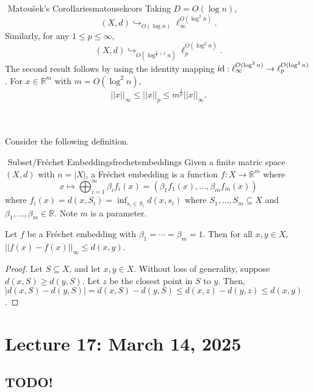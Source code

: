         \pagebreak
        \begin{corollary}{\Stop\,\,Matou\v{s}ek's Corollaries}{matousekcors}
            Taking \(D=O(\log n)\), 
            \begin{equation*}
                (X,d)\hookrightarrow_{O(\log n)}\ell_\infty^{O(\log^2n)}.
            \end{equation*}
            Similarly, for any \(1\leq p\leq\infty\),
            \begin{equation*}
                (X,d)\hookrightarrow_{O\left(\log^{\frac{2}{p}+1}n\right)}\ell_p^{O(\log^2n)}.
            \end{equation*}
            The second result follows by using the identity mapping \(\operatorname{id}:\ell_\infty^{O(\log^2n)}\to\ell_p^{O(\log^2n)}\). For \(x\in\mathbb{R}^m\) with \(m=O(\log^2n)\),
            \begin{equation*}
                ||x||_\infty\leq||x||_p\leq m^\frac{1}{p}||x||_\infty.
            \end{equation*} 
        \end{corollary}
        \vphantom
        \\
        \\
        Consider the following definition.
        \begin{definition}{\Stop\,\,Subset/Fr\'echet Embeddings}{frechetembeddings}
            Given a finite matric space \((X,d)\) with \(n=|X|\), a Fr\'echet embedding is a function \(f:X\to\mathbb{R}^m\) where
            \begin{equation*}
                x\mapsto\bigoplus_{i=1}^m \beta_i f_i(x)=(\beta_1 f_1(x),\ldots,\beta_m f_m(x))
            \end{equation*}
            where \(f_i(x)=d(x,S_i)=\inf_{s_i\in S_i}d(x,s_i)\) where \(S_1,\ldots,S_m\subseteq X\) and \(\beta_1,\ldots,\beta_m\in\mathbb{R}\). Note \(m\) is a parameter.
        \end{definition}
        \begin{lemma*}
            Let \(f\) be a Fr\'echet embedding with \(\beta_1=\cdots=\beta_m=1\). Then for all \(x,y\in X\), \(||f(x)-f(x)||_\infty\leq d(x,y)\).
            \begin{proof}
                Let \(S\subseteq X\), and let \(x,y\in X\). Without loss of generality, suppose \(d(x,S)\geq d(y,S)\). Let \(z\) be the closest point in \(S\) to \(y\). Then, \(|d(x,S)-d(y,S)|=d(x,S)-d(y,S)\leq d(x,z)-d(y,z)\leq d(x,y)\).
            \end{proof}
        \end{lemma*}

\section{Lecture 17: March 14, 2025}

    \subsection{TODO!}

